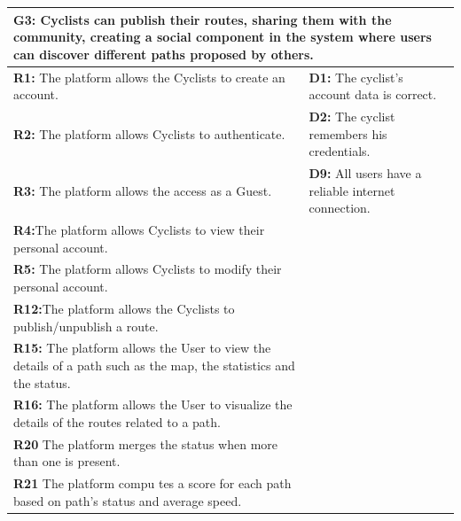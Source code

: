 \begin{table}[h!]
\centering
\begin{tabular}{|p{7cm}|p{7cm}|}
\hline
\multicolumn{2}{|p{14cm}|}{\textbf{G3:} Cyclists can publish their routes, sharing them with the community, creating a social component in the system where users can discover different paths proposed by others.} \\ \hline
\textbf{R1:} The platform allows the Cyclists to create an account. & 
\textbf{D1:} The cyclist’s account data is correct. \\ 
\textbf{R2:} The platform allows Cyclists to authenticate.& 
\textbf{D2:} The cyclist remembers his credentials.\\
\textbf{R3:} The platform allows the access as a Guest. & 
\textbf{D9:} All users have a reliable internet connection.\\
\textbf{R4:}The platform allows Cyclists to view their personal account.& \\
\textbf{R5:} The platform allows Cyclists to modify their personal account.& \\
\textbf{R12:}The platform allows the Cyclists to publish/unpublish a route. &  \\
\textbf{R15:} The platform allows the User to view the details of a path such as the map, the statistics and the status. & \\
\textbf{R16:} The platform allows the User to visualize the details of the routes related to a path.& \\
\textbf{R20} The platform merges the status when more than one is present.&\\
\textbf{R21} The platform compu     tes a score for each path based on path's status and average speed.&\\
\hline
\end{tabular}
\end{table}
\newpage
